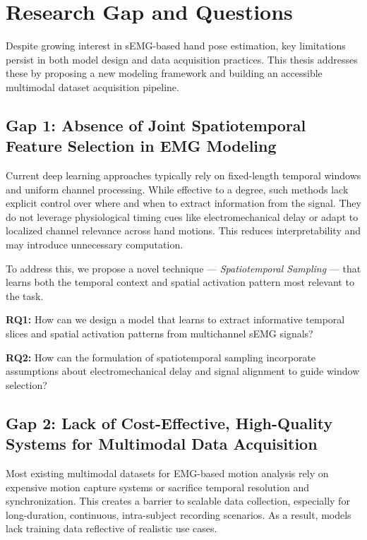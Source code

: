 \section{Research Gap and Questions}

Despite growing interest in sEMG-based hand pose estimation, key limitations persist in both model design and data acquisition practices. This thesis addresses these by proposing a new modeling framework and building an accessible multimodal dataset acquisition pipeline.

\subsection*{Gap 1: Absence of Joint Spatiotemporal Feature Selection in EMG Modeling}

Current deep learning approaches typically rely on fixed-length temporal windows and uniform channel processing. While effective to a degree, such methods lack explicit control over where and when to extract information from the signal. They do not leverage physiological timing cues like electromechanical delay or adapt to localized channel relevance across hand motions. This reduces interpretability and may introduce unnecessary computation.

To address this, we propose a novel technique — \textit{Spatiotemporal Sampling} — that learns both the temporal context and spatial activation pattern most relevant to the task.

\textbf{RQ1:} How can we design a model that learns to extract informative temporal slices and spatial activation patterns from multichannel sEMG signals?

\textbf{RQ2:} How can the formulation of spatiotemporal sampling incorporate assumptions about electromechanical delay and signal alignment to guide window selection?

\subsection*{Gap 2: Lack of Cost-Effective, High-Quality Systems for Multimodal Data Acquisition}

Most existing multimodal datasets for EMG-based motion analysis rely on expensive motion capture systems or sacrifice temporal resolution and synchronization. This creates a barrier to scalable data collection, especially for long-duration, continuous, intra-subject recording scenarios. As a result, models lack training data reflective of realistic use cases.


